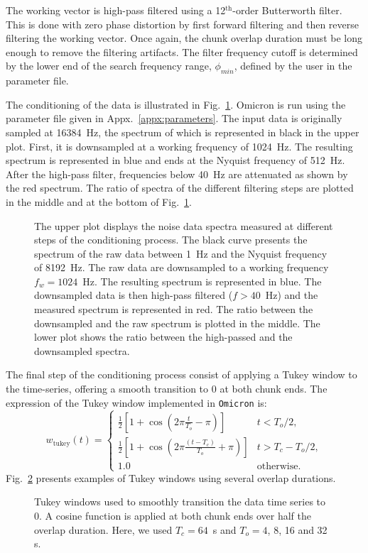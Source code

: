 The working vector is high-pass filtered using a 12$^{\mathrm{th}}$-order Butterworth filter. This is done with zero phase distortion by first forward filtering and then reverse filtering the working vector. Once again, the chunk overlap duration must be long enough to remove the filtering artifacts. The filter frequency cutoff is determined by the lower end of the search frequency range, $\phi_{min}$, defined by the user in the parameter file.

The conditioning of the data is illustrated in Fig.~\ref{fig:conditioning}. Omicron is run using the parameter file given in Appx.~\ref{appx:parameters}. The input data is originally sampled at 16384~Hz, the spectrum of which is represented in black in the upper plot. First, it is downsampled at a working frequency of 1024~Hz. The resulting spectrum is represented in blue and ends at the Nyquist frequency of 512~Hz. After the high-pass filter, frequencies below 40~Hz are attenuated as shown by the red spectrum. The ratio of spectra of the different filtering steps are plotted in the middle and at the bottom of Fig.~\ref{fig:conditioning}.
\begin{figure}
  \center
  \caption{The upper plot displays the noise data spectra measured at different steps of the conditioning process. The black curve presents the spectrum of the raw data between 1~Hz and the Nyquist frequency of 8192~Hz. The raw data are downsampled to a working frequency $f_w=1024$~Hz. The resulting spectrum is represented in blue. The downsampled data is then high-pass filtered ($f>40$~Hz) and the measured spectrum is represented in red. The ratio between the downsampled and the raw spectrum is plotted in the middle. The lower plot shows the ratio between the high-passed and the downsampled spectra.}
  \label{fig:conditioning}
\end{figure}

The final step of the conditioning process consist of applying a Tukey window to the time-series, offering a smooth transition to 0 at both chunk ends. The expression of the Tukey window implemented in \texttt{Omicron} is:
\begin{equation}
  w_{\mathrm{tukey}}(t) = 
  \begin{cases}
     \frac{1}{2}\left[ 1+\cos{\left(2\pi\frac{t}{T_o}-\pi\right)}\right]& t < T_o/2, \\
     \frac{1}{2}\left[ 1+\cos{\left(2\pi\frac{(t-T_c)}{T_o}+\pi\right)}\right]& t > T_c-T_o/2, \\
     1.0 & \mathrm{otherwise}.
  \end{cases}
\end{equation}
Fig.~\ref{fig:tukey} presents examples of Tukey windows using several overlap durations.
\begin{figure}
  \center
  \caption{Tukey windows used to smoothly transition the data time series to 0. A cosine function is applied at both chunk ends over half the overlap duration. Here, we used $T_c=64$~s and $T_o = 4$, 8, 16 and 32 s.}
  \label{fig:tukey}
\end{figure}

